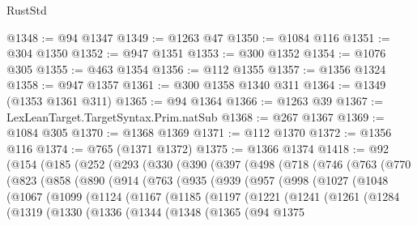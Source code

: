 \begin{lexlean}{RustStd}
\begin{coremodule}
{\begin{coremodule}
{{{{{{{{{{{{{{{{{{{{{{{{{{{{{{{{{{{{{{{{{{{{@1348 := @94 @1347
@1349 := @1263 @47
@1350 := @1084 @116
@1351 := @304 @1350
@1352 := @947 @1351
@1353 := @300 @1352
@1354 := @1076 @305
@1355 := @463 @1354
@1356 := @112 @1355
@1357 := @1356 @1324
@1358 := @947 @1357
@1361 := @300 @1358 @1340 @311
@1364 := @1349 (@1353 @1361 @311)
@1365 := @94 @1364
@1366 := @1263 @39
@1367 := LexLeanTarget.TargetSyntax.Prim.natSub
@1368 := @267 @1367
@1369 := @1084 @305
@1370 := @1368 @1369
@1371 := @112 @1370
@1372 := @1356 @116
@1374 := @765 (@1371 @1372)
@1375 := @1366 @1374
@1418 := @92
    (@154
      (@185
        (@252
          (@293
            (@330
              (@390
                (@397
                  (@498
                    (@718
                      (@746
                        (@763
                          (@770
                            (@823
                              (@858
                                (@890
                                  (@914
                                    (@763
                                      (@935
                                        (@939
                                          (@957
                                            (@998
                                              (@1027
                                                (@1048
                                                  (@1067
                                                    (@1099
                                                      (@1124
                                                        (@1167
                                                          (@1185
                                                            (@1197
                                                              (@1221
                                                                (@1241
                                                                  (@1261
                                                                    (@1284
                                                                      (@1319
                                                                        (@1330
                                                                          (@1336
                                                                            (@1344
                                                                              (@1348
                                                                                (@1365
                                                                                  (@94
                                                                                    @1375
}}}}}}}}}}}}}}}}}}}}}}}}}}}}}}}}}}}}}}}}}}}}
\end{coremodule}}
\end{coremodule}
\end{lexlean}
